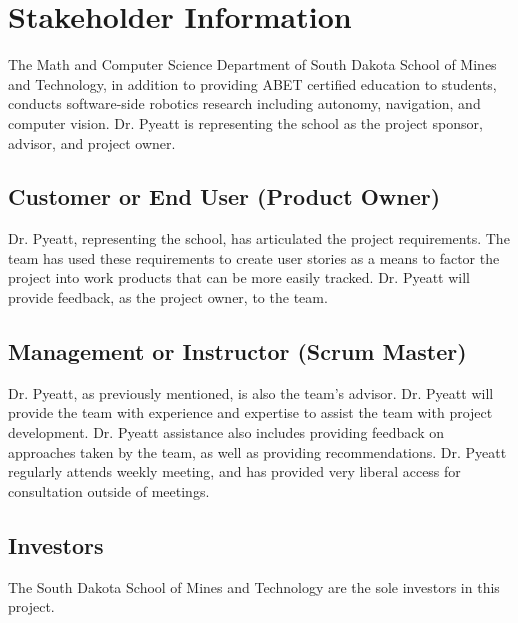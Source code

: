 \section{ Stakeholder Information}
The Math and Computer Science Department of South Dakota School of Mines and Technology, in addition to providing ABET certified education to students, conducts software-side robotics research including
autonomy, navigation, and computer vision. Dr. Pyeatt is representing the school as the project sponsor, advisor, and project owner.\\


\subsection{Customer or End User (Product Owner)}
Dr. Pyeatt, representing the school, has articulated the project requirements. The team has used these requirements to create user stories as a means to factor the project into work products that can be more easily tracked. Dr. Pyeatt will provide feedback, as the project owner, to the team.\\ 

\subsection{Management or Instructor (Scrum Master)}
Dr. Pyeatt, as previously mentioned, is also the team's advisor. Dr. Pyeatt will provide the team with experience and expertise to assist the team with project development. Dr. Pyeatt assistance also includes providing feedback on approaches taken by the team, as well as providing recommendations. Dr. Pyeatt regularly attends weekly meeting, and has provided very liberal access for consultation outside of meetings.\\


\subsection{Investors}
The South Dakota School of Mines and Technology are the sole investors in this project.\\



